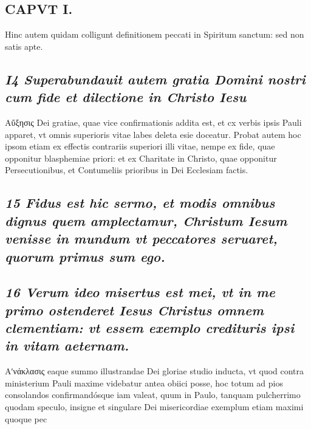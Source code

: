 \documentclass{article}
\begin{document}
\begin{pages}
\section*{CAPVT I. }
\marginpar{[ p.27 ]}\pstart Hinc autem quidam colligunt definitionem peccati in Spiritum sanctum: sed non satis apte.  \pend
{}
{}
\subsection*{\textit{I4 Superabundauit autem gratia Domini nostri cum fide et dilectione in Christo Iesu }}\pstart Αὔξησις Dei gratiae, quae vice confirmationis addita est, et cx verbis ipsis Pauli apparet, vt omnis superioris vitae labes deleta esie doceatur. Probat autem hoc ipsom etiam ex effectis contrariis superiori illi vitae, nempe ex fide, quae opponitur blasphemiae priori: et ex Charitate in Christo, quae opponitur Persecutionibus, et Contumeliis prioribus in Dei Ecclesiam factis.  \pend
{}
{}
\subsection*{\textit{15 Fidus est hic sermo, et modis omnibus dignus quem amplectamur, Christum Iesum venisse in mundum vt peccatores seruaret, quorum primus sum ego. }}
{}
\subsection*{\textit{16 Verum ideo misertus est mei, vt in me primo ostenderet Iesus Christus omnem clementiam: vt essem exemplo credituris ipsi in vitam aeternam. }}\pstart Αʹνάκλασις eaque summo illustrandae Dei gloriae studio inducta, vt quod contra ministerium Pauli maxime videbatur antea obiici posse, hoc totum ad pios consolandos confirmandósque iam valeat, quum in Paulo, tanquam pulcherrimo quodam speculo, insigne et singulare Dei misericordiae exemplum etiam maximi quoque pec\pend

\end{pages}
\end{document}
